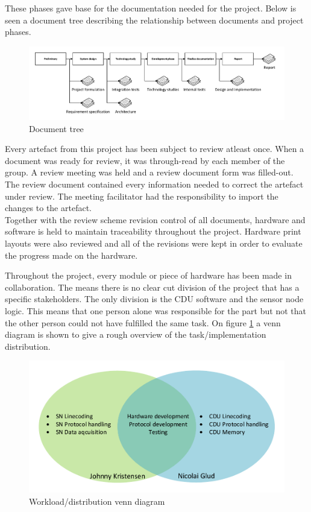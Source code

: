 These phases gave base for the documentation needed for the project. Below is seen a document tree describing the relationship between documents and project phases.

\begin{figure}[hbpt]
	\centering
	\includegraphics[width=.95\textwidth]{billeder/9projectexecution/documenttree}
	\caption{Document tree}
\end{figure}

Every artefact from this project has been subject to review atleast once. When a document was ready for review, it was through-read by each member of the group. A review meeting was held and a review document form was filled-out. The review document contained every information needed to correct the artefact under review. The meeting facilitator had the responsibility to import the changes to the artefact.\\
Together with the review scheme revision control of all documents, hardware and software is held to maintain traceability throughout the project. 
Hardware print layouts were also reviewed and all of the revisions were kept in order to evaluate the progress made on the hardware.

Throughout the project, every module or piece of hardware has been made in collaboration. The means there is no clear cut division of the project that has a specific stakeholders. The only division is the CDU software and the sensor node logic. This means that one person alone was responsible for the part but not that the other person could not have fulfilled the same task. On figure \ref{fig:workvenn} a venn diagram is shown to give a rough overview of the task/implementation distribution.

\begin{figure}[hbpt]
	\centering
	\includegraphics[width=.8\textwidth]{billeder/9projectexecution/workload_venn}
	\caption{Workload/distribution venn diagram}
	\label{fig:workvenn}
\end{figure}

